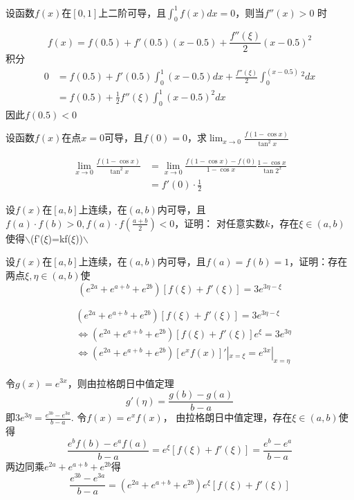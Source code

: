 \documentclass{article}
\begin{document}
\begin{examplle}[]
设函数\(f(x)\)在\([0,1]\)上二阶可导，且\(\int_0^1f(x)dx=0\)，则当\(f''(x)>0\)
时

\begin{equation*}
f(x)=f(0.5)+f'(0.5)(x-0.5)+\frac{f''(\xi)}{2}(x-0.5)^2
\end{equation*}
积分
\begin{align*}
0&=f(0.5)+f'(0.5)\int_0^1(x-0.5)dx+\frac{f''(\xi)}{2}\int_0^(x-0.5)^2dx\\
&=f(0.5)+\frac{1}{2}f''(\xi)\int_0^1(x-0.5)^2dx
\end{align*}
因此\(f(0.5)<0\)
\end{examplle}

\begin{examplle}[]
设函数\(f(x)\)在点\(x=0\)可导，且\(f(0)=0\)，求\(\lim_{x\to0}\frac{f(1-\cos
  x)}{\tan^2x}\)

\begin{align*}
\lim_{x\to0}\frac{f(1-\cos
x)}{\tan^2x}&=
\lim_{x\to0}\frac{f(1-\cos x)-f(0)}{1-\cos x}\frac{1-\cos x}{\tan2^x}\\
&=f'(0)\cdot\frac{1}{2}
\end{align*}
\end{examplle}

\begin{examplle}[]
设\(f(x)\)在\([a,b]\)上连续，在\((a,b)\)内可导，且\(f(a)\cdot f(b)>0,f(a)\cdot
  f(\frac{a+b}{2})<0\)，证明： 对任意实数\(k\)，存在\(\xi\in(a,b)\)使得$\backslash$(f'(\(\xi\))=kf(\(\xi\)))$\backslash$
\end{examplle}

\begin{examplle}[]
设\(f(x)\)在\([a,b]\)上连续，在\((a,b)\)内可导，且\(f(a)=f(b)=1\)，证明：存在
两点\(\xi,\eta\in(a,b)\)使
\begin{equation*}
(e^{2a}+e^{a+b}+e^{2b})[f(\xi)+f'(\xi)]=3e^{3\eta-\xi}
\end{equation*}


\begin{align*}
&(e^{2a}+e^{a+b}+e^{2b})[f(\xi)+f'(\xi)]=3e^{3\eta-\xi}\\
&\Leftrightarrow (e^{2a}+e^{a+b}+e^{2b})[f(\xi)+f'(\xi)]e^{\xi}=3e^{3\eta}\\
&\Leftrightarrow(e^{2a}+e^{a+b}+e^{2b})[e^xf(x)]'|_{x=\xi}=
e^{3x}|_{x=\eta}
\end{align*}

令\(g(x)=e^{3x}\)，则由拉格朗日中值定理
\begin{equation*}
g'(\eta)=\frac{g(b)-g(a)}{b-a}
\end{equation*}
即\(\displaystyle  3e^{3\eta}=\frac{e^{3b}-e^{3a}}{b-a}\). 令\(f(x)=e^xf(x)\)，
由拉格朗日中值定理，存在\(\xi\in(a,b)\)使得
\begin{equation*}
\frac{e^bf(b)-e^af(a)}{b-a}=e^{\xi}[f(\xi)+f'(\xi)]=\frac{e^b-e^a}{b-a}
\end{equation*}
两边同乘\(e^{2a}+e^{a+b}+e^{2b}\)得
\begin{equation*}
\frac{e^{3b}-e^{3a}}{b-a}=(e^{2a}+e^{a+b}+e^{2b})e^{\xi}[f(\xi)+f'(\xi)]
\end{equation*}
\end{examplle}
\end{document}
